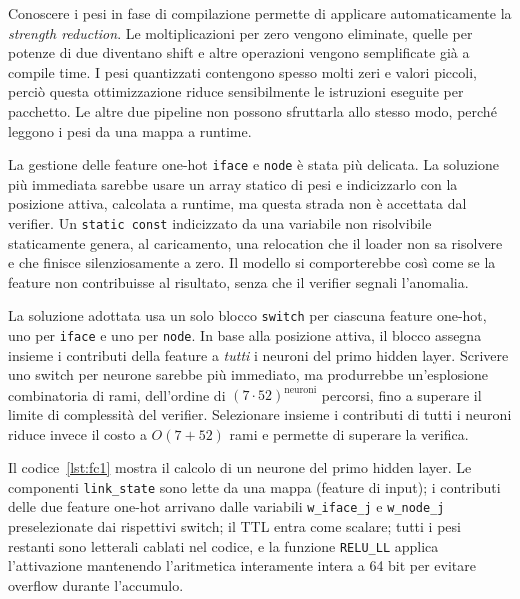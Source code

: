 \documentclass[binding=0.6cm,italian,oneside,noexaminfo]{sapthesis}
\begin{document}
Conoscere i pesi in fase di compilazione permette di applicare automaticamente la \emph{strength reduction}. Le moltiplicazioni per zero vengono eliminate, quelle per potenze di due diventano shift e altre operazioni vengono semplificate già a compile time. I pesi quantizzati contengono spesso molti zeri e valori piccoli, perciò questa ottimizzazione riduce sensibilmente le istruzioni eseguite per pacchetto. Le altre due pipeline non possono sfruttarla allo stesso modo, perché leggono i pesi da una mappa a runtime.

La gestione delle feature one-hot \texttt{iface} e \texttt{node} è stata più delicata. La soluzione più immediata sarebbe usare un array statico di pesi e indicizzarlo con la posizione attiva, calcolata a runtime, ma questa strada non è accettata dal verifier. Un \texttt{static const} indicizzato da una variabile non risolvibile staticamente genera, al caricamento, una relocation che il loader non sa risolvere e che finisce silenziosamente a zero. Il modello si comporterebbe così come se la feature non contribuisse al risultato, senza che il verifier segnali l'anomalia.

La soluzione adottata usa un solo blocco \texttt{switch} per ciascuna feature one-hot, uno per \texttt{iface} e uno per \texttt{node}. In base alla posizione attiva, il blocco assegna insieme i contributi della feature a \emph{tutti} i neuroni del primo hidden layer. Scrivere uno switch per neurone sarebbe più immediato, ma produrrebbe un'esplosione combinatoria di rami, dell'ordine di $(7 \cdot 52)^{\text{neuroni}}$ percorsi, fino a superare il limite di complessità del verifier. Selezionare insieme i contributi di tutti i neuroni riduce invece il costo a $O(7 + 52)$ rami e permette di superare la verifica.

Il codice~\ref{lst:fc1} mostra il calcolo di un neurone del primo hidden layer. Le componenti \texttt{link\_state} sono lette da una mappa (feature di input); i contributi delle due feature one-hot arrivano dalle variabili \texttt{w\_iface\_j} e \texttt{w\_node\_j} preselezionate dai rispettivi switch; il TTL entra come scalare; tutti i pesi restanti sono letterali cablati nel codice, e la funzione \texttt{RELU\_LL} applica l'attivazione mantenendo l'aritmetica interamente intera a 64 bit per evitare overflow durante l'accumulo.
\end{document}
